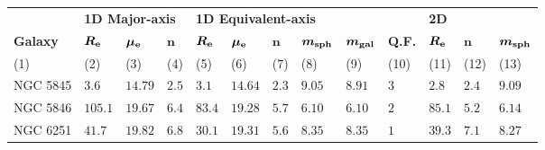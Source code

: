 \begin{table*}                                        
\begin{center}                                        
\begin{tabular}{lllllllllllll}                           
\hline                                                
 & 
\multicolumn{3}{l}{{\bf 1D Major-axis}} &                   
\multicolumn{5}{l}{{\bf 1D Equivalent-axis }} &                   
 & 
\multicolumn{3}{l}{{\bf 2D }} \\                    
\multicolumn{1}{l}{{\bf Galaxy }} &                   
\multicolumn{1}{l}{{\bf $\bm{R_{\rm e}}$ }} &                 
\multicolumn{1}{l}{{\bf $\bm{\mu_{\rm e}}$ }} &  
\multicolumn{1}{l}{{\bf $\bm{n}$ }} &			  
\multicolumn{1}{l}{{\bf $\bm{R_{\rm e}}$ }} &			  
\multicolumn{1}{l}{{\bf $\bm{\mu_{\rm e}}$ }} &			  
\multicolumn{1}{l}{{\bf $\bm{n}$ }} &			  
\multicolumn{1}{l}{{\bf $\bm{m_{\rm sph}}$ }} &			  
\multicolumn{1}{l}{{\bf $\bm{m_{\rm gal}}$ }} &			  
\multicolumn{1}{l}{{\bf Q.F. }} &			  
\multicolumn{1}{l}{{\bf $\bm{R_{\rm e}}$ }} &			  
\multicolumn{1}{l}{{\bf $\bm{n}$ }} &                   
\multicolumn{1}{l}{{\bf $\bm{m_{\rm sph}}$ }} \\                
\multicolumn{1}{l}{(1)} &                             
\multicolumn{1}{l}{(2)} &                             
\multicolumn{1}{l}{(3)} &                             
\multicolumn{1}{l}{(4)} &                             
\multicolumn{1}{l}{(5)} &                             
\multicolumn{1}{l}{(6)} &                             
\multicolumn{1}{l}{(7)} &                             
\multicolumn{1}{l}{(8)} &                             
\multicolumn{1}{l}{(9)} &                             
\multicolumn{1}{l}{(10)} &                             
\multicolumn{1}{l}{(11)} &                             
\multicolumn{1}{l}{(12)} &                             
\multicolumn{1}{l}{(13)} \\                         
\hline                                                
NGC 5845  \quad &  $3.6$  &  $14.79$  &  $2.5$  \quad \quad &  $3.1$  &  $14.64$  &  $2.3$  &  $9.05$  &  $8.91$  \quad \quad &  $3$  \quad \quad &  $2.8$  &  $2.4$  &  $9.09$  \\ 
NGC 5846  \quad &  $105.1$  &  $19.67$  &  $6.4$  \quad \quad &  $83.4$  &  $19.28$  &  $5.7$  &  $6.10$  &  $6.10$  \quad \quad &  $2$  \quad \quad &  $85.1$  &  $5.2$  &  $6.14$  \\ 
NGC 6251  \quad &  $41.7$  &  $19.82$  &  $6.8$  \quad \quad &  $30.1$  &  $19.31$  &  $5.6$  &  $8.35$  &  $8.35$  \quad \quad &  $1$  \quad \quad &  $39.3$  &  $7.1$  &  $8.27$  \\ 

\end{tabular}
\end{center}
\end{table*}
